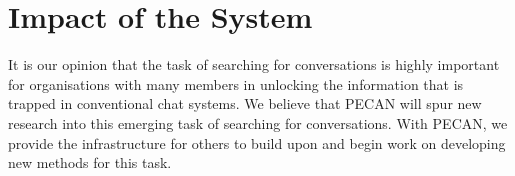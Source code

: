 \section{Impact of the System}

It is our opinion that the task of searching for conversations is highly important for organisations with many members in unlocking the information that is trapped in conventional chat systems. We believe that PECAN will spur new research into this emerging task of searching for conversations. With PECAN, we provide the infrastructure for others to build upon and begin work on developing new methods for this task. 